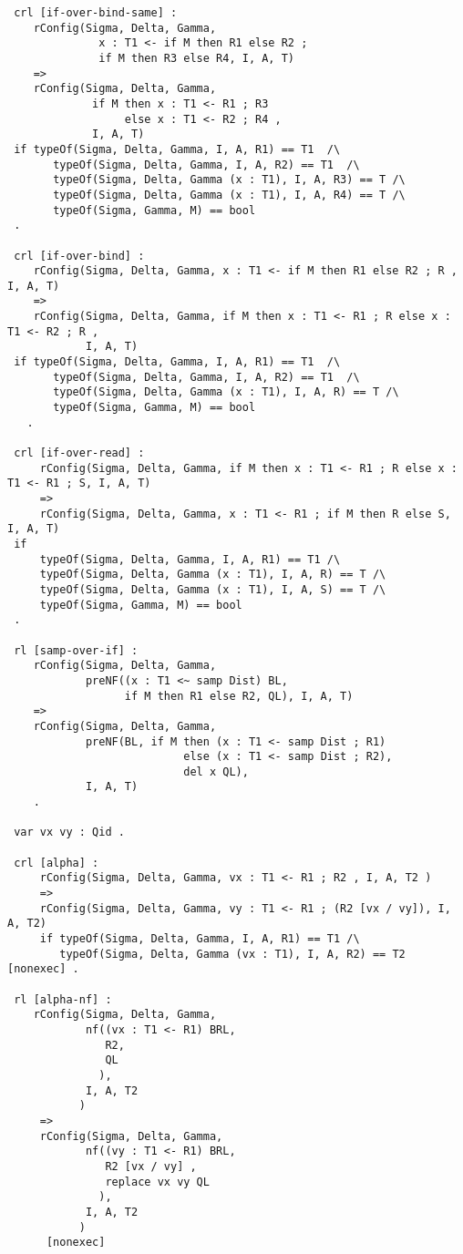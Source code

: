 \begin{lstlisting}
 crl [if-over-bind-same] :
    rConfig(Sigma, Delta, Gamma, 
              x : T1 <- if M then R1 else R2 ; 
              if M then R3 else R4, I, A, T)
    =>
    rConfig(Sigma, Delta, Gamma, 
             if M then x : T1 <- R1 ; R3 
                  else x : T1 <- R2 ; R4 , 
             I, A, T)                   
 if typeOf(Sigma, Delta, Gamma, I, A, R1) == T1  /\
       typeOf(Sigma, Delta, Gamma, I, A, R2) == T1  /\
       typeOf(Sigma, Delta, Gamma (x : T1), I, A, R3) == T /\
       typeOf(Sigma, Delta, Gamma (x : T1), I, A, R4) == T /\
       typeOf(Sigma, Gamma, M) == bool 
 .
 
 crl [if-over-bind] : 
    rConfig(Sigma, Delta, Gamma, x : T1 <- if M then R1 else R2 ; R , I, A, T) 
    =>
    rConfig(Sigma, Delta, Gamma, if M then x : T1 <- R1 ; R else x : T1 <- R2 ; R , 
            I, A, T) 
 if typeOf(Sigma, Delta, Gamma, I, A, R1) == T1  /\
       typeOf(Sigma, Delta, Gamma, I, A, R2) == T1  /\
       typeOf(Sigma, Delta, Gamma (x : T1), I, A, R) == T /\
       typeOf(Sigma, Gamma, M) == bool
   .
      
 crl [if-over-read] : 
     rConfig(Sigma, Delta, Gamma, if M then x : T1 <- R1 ; R else x : T1 <- R1 ; S, I, A, T)
     =>        
     rConfig(Sigma, Delta, Gamma, x : T1 <- R1 ; if M then R else S, I, A, T)
 if
     typeOf(Sigma, Delta, Gamma, I, A, R1) == T1 /\
     typeOf(Sigma, Delta, Gamma (x : T1), I, A, R) == T /\
     typeOf(Sigma, Delta, Gamma (x : T1), I, A, S) == T /\
     typeOf(Sigma, Gamma, M) == bool 
 .
 
 rl [samp-over-if] :
    rConfig(Sigma, Delta, Gamma, 
            preNF((x : T1 <~ samp Dist) BL, 
                  if M then R1 else R2, QL), I, A, T) 
    => 
    rConfig(Sigma, Delta, Gamma, 
            preNF(BL, if M then (x : T1 <- samp Dist ; R1) 
                           else (x : T1 <- samp Dist ; R2), 
                           del x QL), 
            I, A, T) 
    .
 
 var vx vy : Qid . 
        
 crl [alpha] :
     rConfig(Sigma, Delta, Gamma, vx : T1 <- R1 ; R2 , I, A, T2 )
     =>
     rConfig(Sigma, Delta, Gamma, vy : T1 <- R1 ; (R2 [vx / vy]), I, A, T2)
     if typeOf(Sigma, Delta, Gamma, I, A, R1) == T1 /\
        typeOf(Sigma, Delta, Gamma (vx : T1), I, A, R2) == T2 [nonexec] .
        
 rl [alpha-nf] : 
    rConfig(Sigma, Delta, Gamma, 
            nf((vx : T1 <- R1) BRL,
               R2,
               QL
              ),
            I, A, T2    
           )
     => 
     rConfig(Sigma, Delta, Gamma, 
            nf((vy : T1 <- R1) BRL,
               R2 [vx / vy] ,
               replace vx vy QL
              ),
            I, A, T2    
           )   
      [nonexec]        

\end{lstlisting}

